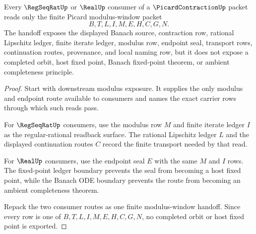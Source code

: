 \begin{theorem}
\label{thm:picardcontraction-real-regseqrat-consumer-handoff}
Every $\RegSeqRatUp$ or $\RealUp$ consumer of a $\PicardContractionUp$ packet reads only the finite Picard modulus-window packet
$$
B,T,L,I,M,E,H,C,G,N.
$$
The handoff exposes the displayed Banach source, contraction row, rational Lipschitz ledger, finite iterate ledger, modulus row, endpoint seal, transport rows, continuation routes, provenance, and local naming row, but it does not expose a completed orbit, host fixed point, Banach fixed-point theorem, or ambient completeness principle.
\end{theorem}
\begin{proof}
Start with downstream modulus exposure. It supplies the only modulus and endpoint route available to consumers and names the exact carrier rows through which such reads pass.

For $\RegSeqRatUp$ consumers, use the modulus row $M$ and finite iterate ledger $I$ as the regular-rational readback surface. The rational Lipschitz ledger $L$ and the displayed continuation routes $C$ record the finite transport needed by that read.

For $\RealUp$ consumers, use the endpoint seal $E$ with the same $M$ and $I$ rows. The fixed-point ledger boundary prevents the seal from becoming a host fixed point, while the Banach ODE boundary prevents the route from becoming an ambient completeness theorem.

Repack the two consumer routes as one finite modulus-window handoff. Since every row is one of $B,T,L,I,M,E,H,C,G,N$, no completed orbit or host fixed point is exported.
\end{proof}

